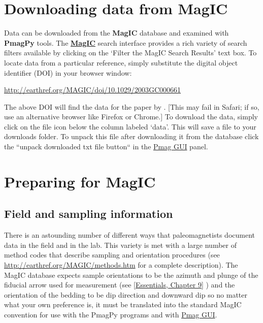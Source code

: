 \documentclass[11pt]{book}
\begin{document}
{

\section{Downloading data from {\bf MagIC}}

Data can be downloaded from the {\bf MagIC} database and examined with {\bf PmagPy} tools.   The \href{http://earthref.org/MAGIC/search/}{\bf MagIC} search interface provides a rich variety of search filters available by clicking on the `Filter the MagIC Search Results' text box.    To locate data from a particular reference,  simply substitute the digital object identifier (DOI) in your browser window:

\href{http://earthref.org/MAGIC/doi/10.1029/2003GC000661}{http://earthref.org/MAGIC/doi/10.1029/2003GC000661}

\noindent The above DOI will find the data for the paper by \cite{tauxe04b}.  [This may fail in Safari; if so, use an alternative browser like Firefox or Chrome.]     To download the data, simply click on the file icon below the column labeled `data'.  This will save a file to your downloads folder.
 To unpack this file after downloading it from the database click the ``unpack downloaded txt file button`` in the \href{#pmag_gui.py}{Pmag GUI}  panel.


 \section{Preparing for MagIC}


\subsection{Field and sampling information}

 There is an astounding number of different ways that paleomagnetists document data in the field and in the lab. This variety is met with a large number  of method codes that describe sampling and orientation procedures (see \url{http://earthref.org/MAGIC/methods.htm} for a complete description).   The MagIC database expects sample orientations to be the azimuth and plunge of the fiducial arrow used for measurement (see  \href{http://earthref.org/MAGIC/books/Tauxe/Essentials/WebBook3ch2.html#ch2}{[Essentials, Chapter 9]} )  and the orientation of the bedding to be dip direction and downward dip so no matter what your own preference is, it must be translated into the standard MagIC convention for use with the PmagPy programs and with \href{#pmag_gui.py}{Pmag GUI}.

}
\end{document}
